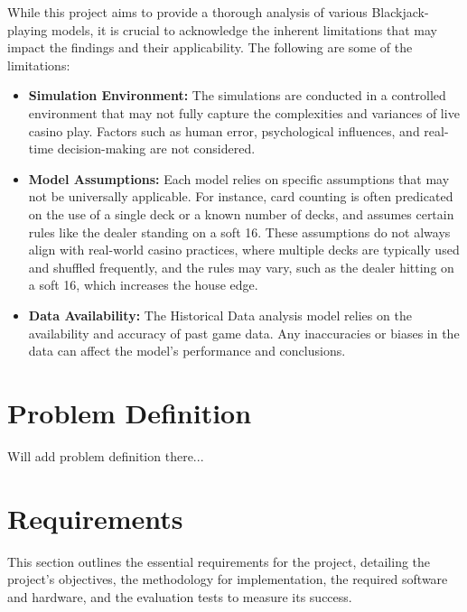 \documentclass[a4paper,12pt]{report}
\begin{document}
While this project aims to provide a thorough analysis of various Blackjack-playing models, it is crucial to acknowledge the inherent limitations that may impact the findings and their applicability. The following are some of the limitations: 

\begin{itemize}
\item \textbf{Simulation Environment:} The simulations are conducted in a controlled environment that may not fully capture the complexities and variances of live casino play. Factors such as human error, psychological influences, and real-time decision-making are not considered.
\item \textbf{Model Assumptions:} Each model relies on specific assumptions that may not be universally applicable. For instance, card counting is often predicated on the use of a single deck or a known number of decks, and assumes certain rules like the dealer standing on a soft 16. These assumptions do not always align with real-world casino practices, where multiple decks are typically used and shuffled frequently, and the rules may vary, such as the dealer hitting on a soft 16, which increases the house edge.
\item \textbf{Data Availability:} The Historical Data analysis model relies on the availability and accuracy of past game data. Any inaccuracies or biases in the data can affect the model’s performance and conclusions.
\end{itemize} 

\section{Problem Definition}

Will add problem definition there...

\section{Requirements} This section outlines the essential requirements for the project, detailing the project's objectives, the methodology for implementation, the required software and hardware, and the evaluation tests to measure its success.
\end{document}
